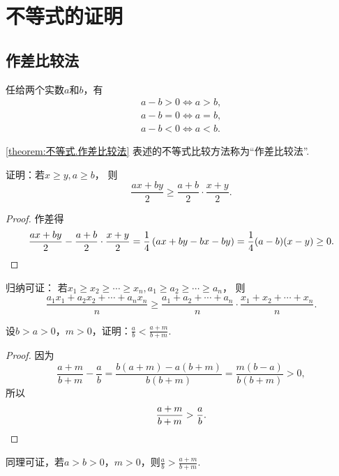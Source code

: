 \section{不等式的证明}
\subsection{作差比较法}
\begin{theorem}\label{theorem:不等式.作差比较法}
任给两个实数\(a\)和\(b\)，有\begin{gather}
	a - b > 0 \iff a > b, \\
	a - b = 0 \iff a = b, \\
	a - b < 0 \iff a < b.
\end{gather}
\end{theorem}
\cref{theorem:不等式.作差比较法} 表述的不等式比较方法称为“作差比较法”.

\begin{example}
证明：若\(x \geq y,
a \geq b\)，
则\[
	\frac{ax+by}2 \geq \frac{a+b}2 \cdot \frac{x+y}2.
\]
\begin{proof}
作差得\[
	\frac{ax+by}2 - \frac{a+b}2 \cdot \frac{x+y}2
	= \frac14 \left( ax+by-bx-by \right)
	= \frac14 (a-b)(x-y)
	\geq 0.
	\qedhere
\]
\end{proof}
\end{example}
\begin{remark}
归纳可证：
若\(x_1 \geq x_2 \geq \dotsb \geq x_n,
a_1 \geq a_2 \geq \dotsb \geq a_n\)，
则\[
	\frac{a_1 x_1 + a_2 x_2 + \dotsb + a_n x_n}{n}
	\geq
	\frac{a_1 + a_2 + \dotsb + a_n}{n}
	\cdot
	\frac{x_1 + x_2 + \dotsb + x_n}{n}.
\]
\end{remark}

\begin{example}\label{example:不等式.真分数的分子分母同加一个正数}
设\(b > a > 0\)，\(m > 0\)，证明：\(\frac{a}{b} < \frac{a+m}{b+m}\).
\begin{proof}
因为\[
	\frac{a+m}{b+m} - \frac{a}{b}
	= \frac{b(a+m) - a(b+m)}{b(b+m)}
	= \frac{m(b-a)}{b(b+m)} > 0,
\]
所以\[
	\frac{a+m}{b+m} > \frac{a}{b}.
	\qedhere
\]
\end{proof}
\end{example}
同理可证，若\(a > b > 0\)，\(m > 0\)，则\(\frac{a}{b} > \frac{a+m}{b+m}\).

